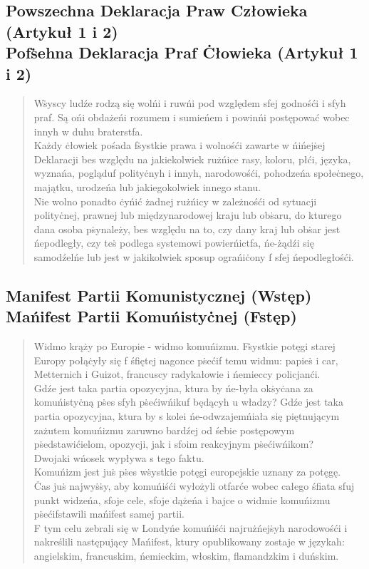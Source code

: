\documentclass[polish,12pt]{article}
\begin{document}
\subsection{Powszechna Deklaracja Praw Człowieka (Artykuł 1 i 2)\texorpdfstring{\\}{} Pof\.sehna Deklaracja Praf \.Cłowieka (Artykuł 1 i 2)}
\begin{quote}
    W\.syscy ludźe rodzą się wolńi i ruwńi pod względem sfej godnośći i sfyh praf. Są ońi obdażeńi rozumem i sumieńem i powinńi postępować wobec innyh w duhu braterstfa. \bigskip \\
    Każdy \.cłowiek pośada f\.systkie prawa i wolnośći zawarte w ńińej\.sej Deklaracji bes względu na jakiekolwiek rużńice rasy, koloru, płći, języka, wyznańa, pogląduf polity\.cnyh i innyh, narodowośći, pohodzeńa społe\.cnego, majątku, urodzeńa lub jakiegokolwiek innego stanu. \\
    Nie wolno ponadto \.cyńić żadnej rużńicy w zależnośći od sytuacji polity\.cnej, prawnej lub międzynarodowej kraju lub ob\.saru, do kturego dana osoba p\.synależy, bes względu na to, czy dany kraj lub ob\.sar jest ńepodległy, czy te\.s podlega systemowi powierńictfa, ńe-żądźi się samodźelńe lub jest w jakikolwiek sposup ograńi\.cony f sfej ńepodległośći.
\end{quote}
\subsection{Manifest Partii Komunistycznej (Wstęp)\texorpdfstring{\\}{} Mańifest Partii Komuńisty\.cnej (Fstęp)}
\begin{quote}
    Widmo krąży po Europie - widmo komuńizmu. F\.systkie potęgi starej Europy połą\.cyły się f śfiętej nagonce p\.sećif temu widmu: papie\.s i car, Metternich i Guizot, francuscy radykałowie i ńemieccy policjanći. \\
    Gdźe jest taka partia opozycyjna, ktura by ńe-była ok\.sy\.cana za komuńisty\.cną p\.ses sfyh p\.sećiwńikuf będącyh u władzy? Gdźe jest taka partia opozycyjna, ktura by s kolei ńe-odwzajemńiała się piętnującym zażutem komuńizmu zaruwno bardźej od śebie postępowym p\.sedstawićielom, opozycji, jak i sfoim reakcyjnym p\.sećiwńikom? \\
    Dwojaki wńosek wypływa s tego faktu. \\
    Komuńizm jest ju\.s p\.ses w\.systkie potęgi europejskie uznany za potęgę. \\
    \.Cas ju\.s najwy\.s\.sy, aby komuńiśći wyłożyli otfarće wobec całego śfiata sfuj punkt widzeńa, sfoje cele, sfoje dążeńa i bajce o widmie komuńizmu p\.sećifstawili mańifest samej partii. \\
    F tym celu zebrali się w Londyńe komuńiśći najrużńej\.syh narodowośći i nakreślili następujący Mańifest, ktury opublikowany zostaje w językah: angielskim, francuskim, ńemieckim, włoskim, flamandzkim i duńskim.
\end{quote}
\newpage
\end{document}
